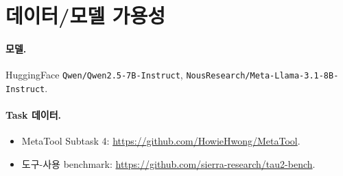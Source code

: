\documentclass[11pt]{article}
\theoremstyle{definition}
\begin{document}
\section{데이터/모델 가용성}
\label{app:data}

\paragraph{모델.} HuggingFace \texttt{Qwen/Qwen2.5-7B-Instruct}, \texttt{NousResearch/Meta-Llama-3.1-8B-Instruct}.

\paragraph{Task 데이터.}
\begin{itemize}[leftmargin=*]
\item MetaTool Subtask 4: \url{https://github.com/HowieHwong/MetaTool}.
\item 도구-사용 benchmark: \url{https://github.com/sierra-research/tau2-bench}.
\end{itemize}
\end{document}
